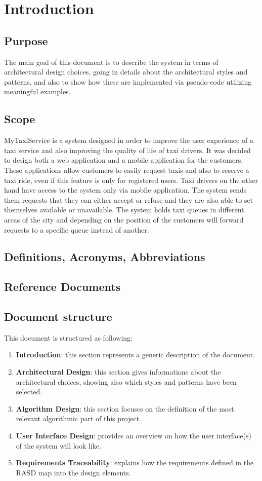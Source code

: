\section{Introduction}
\subsection{Purpose}
The main goal of this document is to describe the system in terms of architectural design choices, going in details about the architectural styles and patterns, and also to show how these are implemented via pseudo-code utilizing meaningful examples.
\subsection{Scope}
MyTaxiService is a system designed in order to improve the user experience of a taxi service and also improving the quality of life of taxi drivers. It was decided to design both a web application and a mobile application for the customers. These applications allow customers to easily request taxis and also to reserve a taxi ride, even if this feature is only for registered users. Taxi drivers on the other hand have access to the system only via mobile application. The system sends them requests that they can either accept or refuse and they are also able to set themselves available or unavailable. The system holds taxi queues in different areas of the city and depending on the position of the customers will forward requests to a specific queue instead of another. 
\subsection{Definitions, Acronyms, Abbreviations}
\subsection{Reference Documents}
\subsection{Document structure}
This document is structured as following:
\begin{enumerate}
	\item \textbf{Introduction}: this section represents a generic description of the document.
	\item \textbf{Architectural Design}: this section gives informations about the architectural choices, showing also which styles and patterns have been selected.
	\item \textbf{Algorithm Design}: this section focuses on the definition of the most relevant
	algorithmic part of this project.
	\item \textbf{User Interface Design}: provides an overview on how the user interface(s) of the system will look like.
	\item \textbf{Requirements Traceability}: explains how the requirements defined in the RASD map	into the design elements.
\end{enumerate}